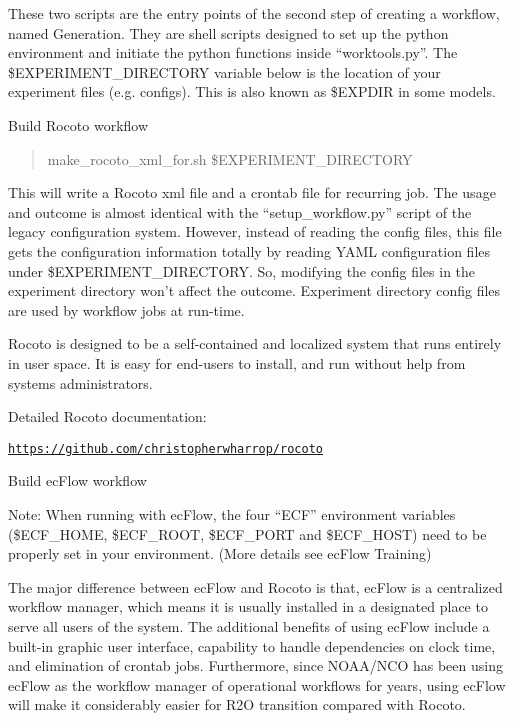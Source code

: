 These two scripts are the entry points of the second step of creating a workflow, named Generation. They are shell scripts designed to set up the python environment and initiate the python functions inside “worktools.\-py”. The \$\-E\-X\-P\-E\-R\-I\-M\-E\-N\-T\-\_\-\-D\-I\-R\-E\-C\-T\-O\-R\-Y variable below is the location of your experiment files (e.\-g. configs). This is also known as \$\-E\-X\-P\-D\-I\-R in some models.

Build Rocoto workflow

\begin{quotation}
make\-\_\-rocoto\-\_\-xml\-\_\-for.\-sh \$\-E\-X\-P\-E\-R\-I\-M\-E\-N\-T\-\_\-\-D\-I\-R\-E\-C\-T\-O\-R\-Y

\end{quotation}


This will write a Rocoto xml file and a crontab file for recurring job. The usage and outcome is almost identical with the “setup\-\_\-workflow.\-py” script of the legacy configuration system. However, instead of reading the config files, this file gets the configuration information totally by reading Y\-A\-M\-L configuration files under \$\-E\-X\-P\-E\-R\-I\-M\-E\-N\-T\-\_\-\-D\-I\-R\-E\-C\-T\-O\-R\-Y. So, modifying the config files in the experiment directory won’t affect the outcome. Experiment directory config files are used by workflow jobs at run-\/time.

Rocoto is designed to be a self-\/contained and localized system that runs entirely in user space. It is easy for end-\/users to install, and run without help from systems administrators.

Detailed Rocoto documentation\-:

\href{https://github.com/christopherwharrop/rocoto}{\tt https\-://github.\-com/christopherwharrop/rocoto}

Build ec\-Flow workflow 


Note\-: When running with ec\-Flow, the four “\-E\-C\-F” environment variables (\$\-E\-C\-F\-\_\-\-H\-O\-M\-E, \$\-E\-C\-F\-\_\-\-R\-O\-O\-T, \$\-E\-C\-F\-\_\-\-P\-O\-R\-T and \$\-E\-C\-F\-\_\-\-H\-O\-S\-T) need to be properly set in your environment. (More details see ec\-Flow Training)

The major difference between ec\-Flow and Rocoto is that, ec\-Flow is a centralized workflow manager, which means it is usually installed in a designated place to serve all users of the system. The additional benefits of using ec\-Flow include a built-\/in graphic user interface, capability to handle dependencies on clock time, and elimination of crontab jobs. Furthermore, since N\-O\-A\-A/\-N\-C\-O has been using ec\-Flow as the workflow manager of operational workflows for years, using ec\-Flow will make it considerably easier for R2\-O transition compared with Rocoto.

